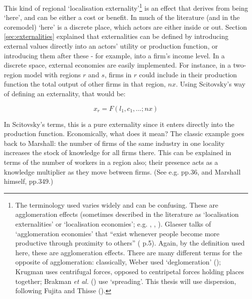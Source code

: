{This kind of regional `localisation externality'\footnote{The terminology used varies widely and can be confusing. These are agglomeration effects (sometimes described in the literature as `localisation externalities' or `localisation economies'; e.g. \citealt{malmberg_elusive_2002}, \citealt{wheeler_localization_2007}, \citealt{figueiredo_localization_2009}). Glaeser talks of `agglomeration economies' that ``exist whenever people become more productive through proximity to others'' (\citealt{glaeser_cities_2008} p.5). Again, by the definition used here, these are agglomeration effects.  There are many different terms for the opposite of agglomeration: classically, Weber used `deglomeration' (\citealt{weber_theory_1909}); Krugman uses centrifugal forces, opposed to centripetal forces holding places together; Brakman \emph{et al.} (\citeyear{brakman_new_2009}) use `spreading'. This thesis will use dispersion, following Fujita and Thisse (\citeyear{fujita_agglomeration_2002}).} 
is an effect that derives from being `here', and can be either a cost or benefit. In much of the literature (and in the \gls{coremodel}) `here' is a discrete place, which actors are either inside or out. Section \ref{sec:externalities} explained that externalities can be defined by introducing external values directly into an actors' utility or production function, or introducing them after these - for example, into a firm's income level. In a discrete space, external economies are easily implemented. For instance, in a two-region model with regions $r$ and $s$, firms in $r$ could include in their production function the total output of other firms in that region, $nx$. Using Scitovsky's way of defining an externality, that would be:

\begin{equation}
x_{r}=F(l_{1},c_{1},...;nx)\label{eq:locext1}
\end{equation}

In Scitovsky's terms, this is a pure externality since it enters directly into the production function. Economically, what does it mean? The classic example goes back to Marshall: the number of firms of the same industry in one locality increases the stock of knowledge for all firms there. This can be explained in terms of the number of workers in a region also; their presence acts as a knowledge multiplier as they move between firms. (See e.g. \citealt{ krugman_geography_1991} pp.36, and Marshall himself, \citeyear{ marshall_principles_1895} pp.349.)

}
